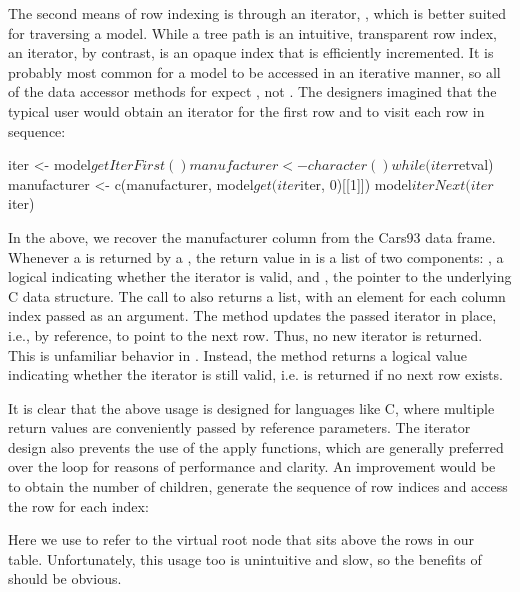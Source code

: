 The second means of row indexing is through an iterator,
, which is better suited for traversing a model.
While a tree path is an intuitive, transparent row index, an iterator,
by contrast, is an opaque index that is efficiently incremented. It is
probably most common for a model to be accessed in an iterative
manner, so all of the data accessor methods for 
expect , not . The \GTK\/
designers imagined that the typical user would obtain an iterator for
the first row and to visit each row in sequence:
\begin{Schunk}
\begin{Sinput}
 iter <- model$getIterFirst()
 manufacturer <- character()
 while(iter$retval) {
   manufacturer <- c(manufacturer, model$get(iter$iter, 0)[[1]])
   model$iterNext(iter$iter)
 }
\end{Sinput}
\end{Schunk}
%
In the above, we recover the manufacturer column from the Cars93 data
frame. Whenever a  is returned by a
, the return value in \R\/ is a list of two
components: , a logical indicating whether the iterator
is valid, and , the pointer to the underlying C data
structure. The call to  also returns a list,
with an element for each column index passed as an argument. The
method  updates the passed iterator in
place, i.e., by reference, to point to the next row. Thus, no new
iterator is returned. This is unfamiliar behavior in \R. Instead, the
method returns a logical value indicating whether the iterator is
still valid, i.e.  is returned if no next row exists.

It is clear that the above usage is designed for languages like C,
where multiple return values are conveniently passed by reference
parameters. The iterator design also prevents the use of the apply
functions, which are generally preferred over the  loop
for reasons of performance and clarity. An improvement would be to
obtain the number of children, generate the sequence of row indices
and access the row for each index:
\begin{Schunk}
\end{Schunk}
%
Here we use  to refer to the virtual root node that sits
above the rows in our table. Unfortunately, this usage too is
unintuitive and slow, so the benefits of  should
be obvious.

